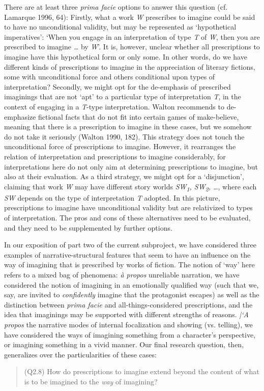 \noindent There are at least three \emph{prima facie} options to answer this question (cf. Lamarque 1996, 64): Firstly, what a work \emph{W} prescribes to imagine could be said to have no unconditional validity, but may be represented as `hypothetical imperatives': `When you engage in an interpretation of type \emph{T} of \emph{W}, then you are prescribed to imagine \emph{\ldots} by \emph{W}'. It is, however, unclear whether all prescriptions to imagine have this hypothetical form or only some. In other words, do we have different kinds of prescriptions to imagine in the appreciation of literary fictions, some with unconditional force and others conditional upon types of interpretation? Secondly, we might opt for the de-emphasis of prescribed imaginings that are not `apt' to a particular type of interpretation \emph{T}, in the context of engaging in a \emph{T}-type interpretation. Walton recommends to de-emphasize fictional facts that do not fit into certain games of make-believe, meaning that there is a prescription to imagine in these cases, but we somehow do not take it seriously (Walton 1990, 182). This strategy does not touch the unconditional force of prescriptions to imagine. However, it rearranges the relation of interpretation and prescriptions to imagine considerably, for interpretations here do not only aim at determining prescriptions to imagine, but also at their evaluation. As a third strategy, we might opt for a `disjunction', claiming that work \emph{W} may have different story worlds \emph{SW\textsubscript{1}, SW\textsubscript{2}, \ldots}, where each \emph{SW} depends on the type of interpretation \emph{T} adopted. In this picture, prescriptions to imagine have unconditional validity but are relativized to types of interpretation. The pros and cons of these alternatives need to be evaluated, and they need to be supplemented by further options. 

In our exposition of part two of the current subproject, we have considered three examples of narrative-structural features that seem to have an influence on the way of imagining that is prescribed by works of fiction. The notion of `way' here refers to a mixed bag of phenomena: \emph{\`a propos} unreliable narration, we have considered the notion of imagining in an emotionally qualified way (such that we, say, are invited to \emph{confidently} imagine that the protagonist escapes) as well as the distinction between \emph{prima facie} and all-things-considered prescriptions, and the idea that imaginings may be supported with different strengths of reasons. \emph{|`A propos} the narrative modes of internal focalization and showing (vs. telling), we have considered the ways of imagining something from a character's perspective, or imagining something in a vivid manner. Our final research question, then, generalizes over the particularities of these cases:

\vspace{-.2cm}
\begin{quote}
(Q2.8) How do prescriptions to imagine extend beyond the content of what is to be imagined to the  \emph{way} of imagining?
\end{quote}
\vspace{-.2cm}
